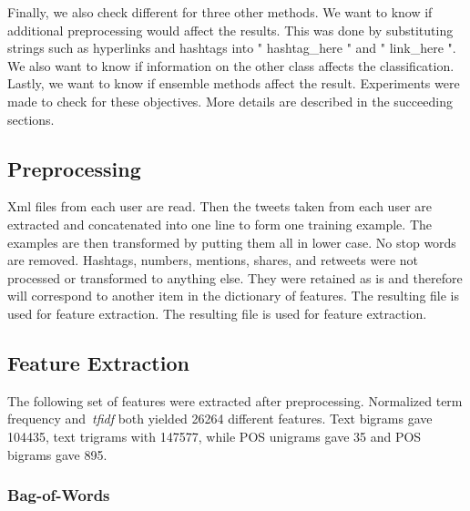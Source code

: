 \documentclass[a4paper]{llncs}
\begin{document}
Finally, we also check different for three other methods. We want to know if additional preprocessing would affect the results. This was done by substituting strings such as hyperlinks and hashtags into " hashtag\_here " and " link\_here ". We also want to know if information on the other class affects the classification. Lastly, we want to know if ensemble methods affect the result. Experiments were made to check for these objectives. More details are described in the succeeding sections.


\subsection{Preprocessing}
Xml files from each user are read. Then the tweets taken from each user are extracted and concatenated into one line to form one training example. The examples are then transformed by putting them all in lower case. No stop words are removed. Hashtags, numbers, mentions, shares, and retweets were not processed or transformed to anything else. They were retained as is and therefore will correspond to another item in the dictionary of features. The resulting file is used for feature extraction.  The resulting file is used for feature extraction.  

\subsection{Feature Extraction}
The following set of features were extracted after preprocessing. Normalized term frequency and~\textit{tfidf} both yielded 26264 different features. Text bigrams gave 104435, text trigrams with 147577, while POS unigrams gave 35 and POS bigrams gave 895.

%
%

\subsubsection{Bag-of-Words}
\end{document}
